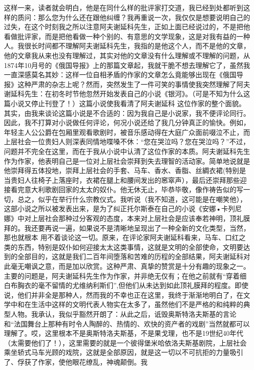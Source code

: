 \documentclass{article}
\begin{document}
这样一来，读者就会明白，他是在同什么样的批评家打交道，我已经到处都听到这样的质问：那么您为什么还在跟他纠缠？我再重说一次，我仅仅是想要说明自己的过失，在这个时刻我之所以注意阿夫谢延科先生，正如上面已经说过的，不是把他看做批评家，而是把他看做一种个别的、有意思的文学现象，这是对我有益的一种人。我很长时间都不理解阿夫谢延科先生，我指的是他这个人，而不是他的文章，他的文章我从来也没有理解过，其实对他的文章没有什么理解或不理解的问题，从1874年10月号的《俄国导报》上的那篇文章起，我就干脆不想去理解它了，虽然我一直深感莫名其妙：这样一位自相矛盾的作家的文章怎么竟能够出现在《俄国导报》这种严肃的杂志上呢？然而，突然发生了一件可笑的事情使我突然理解了阿夫谢延科先生：在初冬时节他忽然开始发表自己的小说《银河》。（可是不知为什么这篇小说又停止刊登了！）这篇小说使我看清了阿夫谢延科
\newpage
这位作家的整个面貌。其实，由我来谈论这篇小说是不合适的：因为我自己是小说家，我不便评论同行。因此，我不打算对小说做任何评论，何况小说还给了我几分钟真正的愉快。例如，年轻主人公公爵在包厢里观看歌剧时，被音乐感动得在大庭广众面前啜泣不止，而上层社会一位贵妇人则深表同情地喋嗓不休：“您在哭泣吗？您在哭泣吗？”不过，问题并不完全在这里，而在于我从小说中认清了这位作家的本质。阿夫谢延科先生作为作家，他表明自己是一位对上层社会崇拜到失去理智的活动家。简单地说就是他崇拜得五体投地，崇拜上层社会的手套、马车、香水、香脂、丝綢衣裙(特别是当贵妇人往椅子上落座时，衣裙在腿上和腰间发出的窸窣声），最后还崇拜那些迎接看完意大利歌剧回家的太太的奴仆。他无休无止，毕恭毕敬，像作祷告似的写一切，总之，似乎在举行什么宗教仪式。我听说（我不知道，这可能是在嘲笑他），这部小说之所以被发表出来，是为了纠正托尔斯泰在自己的小说《安娜•卡列尼娜》中对上层社会那种过分客观的态度，本来对上层社会是应该奉若神明，顶礼膜拜的。我还要再说一遍，如果说不是清晰地呈现出了一种全新的文化类型，当然，那也就根本
\newpage
用不着谈论这一切。原来，在评论家阿夫谢延科看来，马车、口红之类的东西，特别是奴仆如何迎接太太这类事情，这就是文明的全部使命，文明要达到的全部目的，这就是我们二百年间堕落和苦难的历程的全部结果，阿夫谢延科对此毫无嘲讽之意，而是加以欣赏。这种严肃、真挚的赞赏是十分有趣的现象之一。主要的问题是，阿夫谢延科先生作为作家，并非绝无仅有；在他之前就有“穿着细白布胸衣的毫不留情的尤维纳利斯们”,但他们从未达到如此顶礼膜拜的程度。即使说，他们并非全是那种人，然而我的不幸也正在这里，我终于渐渐地明白了，在文学中和在生活中这样的文明代表人物实在太多了，虽然他们不是严格的和纯粹的典型人物。我承认，我似乎豁然开朗了：从此之后，诋毁奥斯特洛夫斯基的言论和“法国舞台上那种有时令人陶醉的、热情的、欢快的资产者的戏剧”当然就都可以理解了。哎，这里根本不是奥斯特洛夫斯基，不是果戈理，也不是19世纪40年代（太需要他们了！），这里需要的就是一个彼得堡米哈依洛夫斯基剧院，上层社会乘坐轿式马车光顾的戏院，这就是全部原因，就是这一切以不可抗拒的力量吸引了、俘获了作家，使他眼花缭乱，神魂颠倒。我
\end{document}
